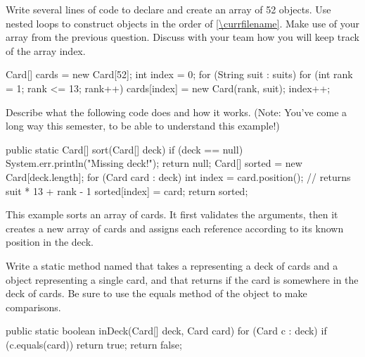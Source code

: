 \Q Write several lines of code to declare and create an array of 52  objects.
Use nested  loops to construct  objects in the order of \ref{\currfilename}.
Make use of your  array from the previous question.
Discuss with your team how you will keep track of the array index.

\vspace*{-1ex}
\begin{answer}[11em]
\begin{javaans}
Card[] cards = new Card[52];
int index = 0;
for (String suit : suits) {
    for (int rank = 1; rank <= 13; rank++) {
        cards[index] = new Card(rank, suit);
        index++;
    }
}
\end{javaans}
\end{answer}


\Q Describe what the following code does and how it works. (Note: You've come a long way this semester, to be able to understand this example!)

\begin{javalst}
public static Card[] sort(Card[] deck) {
    if (deck == null) {
        System.err.println("Missing deck!");
        return null;
    }
    Card[] sorted = new Card[deck.length];
    for (Card card : deck) {
        int index = card.position();       // returns suit * 13 + rank - 1
        sorted[index] = card;
    }
    return sorted;
}
\end{javalst}

\begin{answer}[5em]
This example sorts an array of cards.
It first validates the arguments, then it creates a new array of cards and assigns each  reference according to its known position in the deck.
\end{answer}


\Q Write a static method named  that takes a  representing a deck of cards and a  object representing a single card, and that returns  if the card is somewhere in the deck of cards. Be sure to use the equals method of the  object to make comparisons.

\vspace{-1ex}
\begin{answer}[11em]
\begin{javaans}
public static boolean inDeck(Card[] deck, Card card) {
    for (Card c : deck) {
        if (c.equals(card)) {
            return true;
        }
    }
    return false;
}
\end{javaans}
\end{answer}
